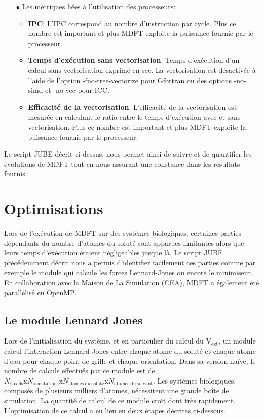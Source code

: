 \begin{itemize}
\item[$\bullet$] Les métriques liées à l'utilisation des processeurs:
  \begin{itemize}
  \item \textbf{IPC}: L'IPC correspond au nombre d'instruction par cycle. Plus ce nombre est important et plus MDFT exploite la puissance fournie par le processeur.
  \item \textbf{Temps d'exécution sans vectorisation}: Temps d’exécution d'un calcul sans vectorisation exprimé en sec. La vectorisation est désactivée à l'aide de l'option -fno-tree-vectorize pour Gfortran ou des options -no-simd et -no-vec pour ICC. 
  \item \textbf{Efficacité de la vectorisation}: L'efficacité de la vectorisation est mesurée en calculant le ratio entre le temps d'exécution avec et sans vectorisation. Plus ce nombre est important et plus MDFT exploite la puissance fournie par le processeur.
  \end{itemize}
  \vspace*{1.5ex}%

\end{itemize}

Le script JUBE décrit ci-dessus, nous permet ainsi de suivre et de quantifier les évolutions de MDFT tout en nous assurant une constance dans les résultats fournis.


\section{Optimisations}
Lors de l'exécution de MDFT sur des systèmes biologiques, certaines parties dépendants du nombre d'atomes du soluté sont apparues limitantes alors que leurs temps d'exécution étaient négligeables jusque là. Le script JUBE précédemment décrit nous a permis d'identifier facilement ces parties comme par exemple le module qui calcule les forces Lennard-Jones ou encore le minimiseur. En collaboration avec la Maison de La Simulation (CEA), MDFT a également été parallélisé en OpenMP.


\subsection{Le module Lennard Jones}
Lors de l’initialisation du système, et en particulier du calcul du $\mathrm{V}_\mathrm{ext}$, un module calcul l’interaction Lennard-Jones entre chaque atome du soluté et chaque atome d'eau pour chaque point de grille et chaque orientation. Dans sa version naïve, le nombre de calculs effectués par ce module est de $N_{\mathrm{voxels}}\mathrm{x}N_{\mathrm{orientations}}\mathrm{x}N_{\mathrm{atomes\ du\ solute}}\mathrm{x}N_{\mathrm{atomes\ du\ solvant}}$. Les systèmes biologiques, composés de plusieurs milliers d'atomes, nécessitent une grande boîte de simulation. La quantité de calcul de ce module croît dont très rapidement. L'optimisation de ce calcul a eu lieu en deux étapes décrites ci-dessous.

